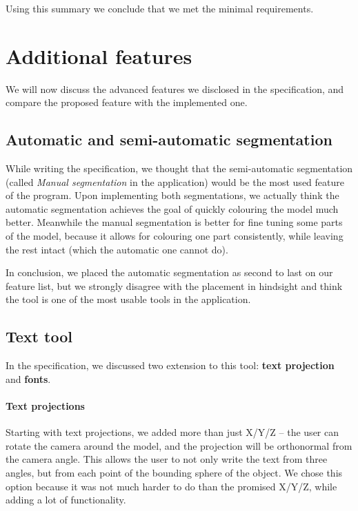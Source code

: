 Using this summary we conclude that we met the minimal requirements.

\section{Additional features}
\label{sec:features}

We will now discuss the advanced features we disclosed in the specification, and compare the proposed feature with the implemented one.

\subsection{Automatic and semi-automatic segmentation}

While writing the specification, we thought that the semi-automatic segmentation (called \textit{Manual segmentation} in the application) would be the most used feature of the program. Upon implementing both segmentations, we actually think the automatic segmentation achieves the goal of quickly colouring the model much better. Meanwhile the manual segmentation is better for fine tuning some parts of the model, because it allows for colouring one part consistently, while leaving the rest intact (which the automatic one cannot do).

In conclusion, we placed the automatic segmentation as second to last on our feature list, but we strongly disagree with the placement in hindsight and think the tool is one of the most usable tools in the application.

\subsection{Text tool}

In the specification, we discussed two extension to this tool: \textbf{text projection} and \textbf{fonts}.

\paragraph{Text projections}

Starting with text projections, we added more than just X/Y/Z -- the user can rotate the camera around the model, and the projection will be orthonormal from the camera angle. This allows the user to not only write the text from three angles, but from each point of the bounding sphere of the object. We chose this option because it was not much harder to do than the promised X/Y/Z, while adding a lot of functionality.

